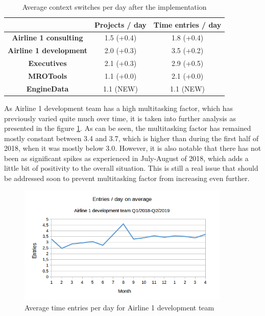 \begin{table}[H]
	\begin{center}
		\begin{tabular}{|c|c|c|}
		\hline
        		                     	  	& \textbf{Projects / day} & \textbf{Time entries / day} \\ \hline
			\textbf{Airline 1 consulting}  & 1.5 (+0.4)              & 1.8 (+0.4)                  \\ \hline
			\textbf{Airline 1 development} & 2.0 (+0.3)              & 3.5 (+0.2)                  \\ \hline
			\textbf{Executives}          	& 2.1 (+0.3)              & 2.9 (+0.5)                  \\ \hline
			\textbf{MROTools}            	& 1.1 (+0.0)              & 2.1 (+0.0)                  \\ \hline
			\textbf{EngineData}          	& 1.1 (NEW)               & 1.1 (NEW)                   \\ \hline
		
		\end{tabular}
		
		\caption{Average context switches per day after the implementation}
		\label{table:toggl-after}
	\end{center}
\end{table}

As Airline 1 development team has a high multitasking factor, which has previously varied quite much over time, it is taken into further analysis as presented in the figure \ref{fig:dev-team-toggl-after}. As
can be seen, the multitasking factor has remained mostly constant between 3.4 and 3.7, which is higher than during the first half of 2018, when it was mostly below 3.0. However, it is also notable that there has
not been as significant spikes as experienced in July-August of 2018, which adds a little bit of positivity to the overall situation. This is still a real issue that should be addressed soon to prevent
multitasking factor from increasing even further.

\begin{figure}[ht]
  \begin{center}
    \includegraphics[width=0.9\textwidth]{images/dev-team-entries-after.png}
    \caption{Average time entries per day for Airline 1 development team}
    \label{fig:dev-team-toggl-after}
  \end{center}
\end{figure}


